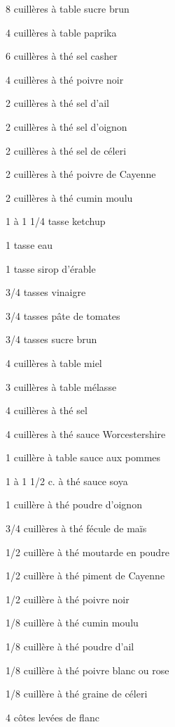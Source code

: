 


\totaltime{}


\begin{ingredients}
    \item[] 
    \item 8 cuillères à table sucre brun
    \item 4 cuillères à table paprika
    \item 6 cuillères à thé sel casher
    \item 4 cuillères à thé poivre noir
    \item 2 cuillères à thé sel d'ail
    \item 2 cuillères à thé sel d'oignon
    \item 2 cuillères à thé sel de céleri
    \item 2 cuillères à thé poivre de Cayenne
    \item 2 cuillères à thé cumin moulu
    \item[] 
    \item 1 à 1 1/4 tasse ketchup
    \item 1 tasse eau
    \item 1 tasse sirop d'érable
    \item 3/4 tasses vinaigre
    \item 3/4 tasses pâte de tomates
    \item 3/4 tasses sucre brun
    \item 4 cuillères à table miel
    \item 3 cuillères à table mélasse
    \item 4 cuillères à thé sel
    \item 4 cuillères à thé sauce Worcestershire
    \item 1 cuillère à table sauce aux pommes
    \item 1 à 1 1/2 c. à thé sauce soya
    \item 1 cuillère à thé poudre d'oignon
    \item 3/4 cuillères à thé fécule de maïs
    \item 1/2 cuillère à thé moutarde en poudre
    \item 1/2 cuillère à thé piment de Cayenne
    \item 1/2 cuillère à thé poivre noir
    \item 1/8 cuillère à thé cumin moulu
    \item 1/8 cuillère à thé poudre d'ail
    \item 1/8 cuillère à thé poivre blanc ou rose
    \item 1/8 cuillère à thé graine de céleri
    \item[] 
    \item 4 côtes levées de flanc
\end{ingredients}

